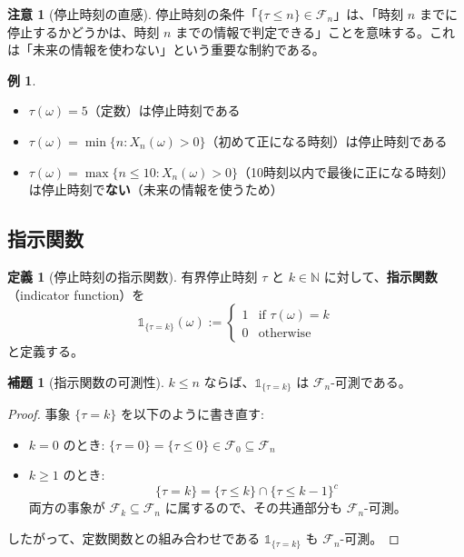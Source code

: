 \documentclass[a4paper,12pt]{ltjsarticle}
\theoremstyle{definition}
\newtheorem{lemma}[theorem]{補題}
\newtheorem{definition}[theorem]{定義}
\newtheorem{example}[theorem]{例}
\newtheorem{remark}[theorem]{注意}
\begin{document}
\begin{remark}[停止時刻の直感]
停止時刻の条件「$\{\tau \leq n\} \in \mathcal{F}_n$」は、「時刻 $n$ までに停止するかどうかは、時刻 $n$ までの情報で判定できる」ことを意味する。これは「未来の情報を使わない」という重要な制約である。
\end{remark}

\begin{example}
\begin{itemize}
\item $\tau(\omega) = 5$（定数）は停止時刻である
\item $\tau(\omega) = \min\{n : X_n(\omega) > 0\}$（初めて正になる時刻）は停止時刻である
\item $\tau(\omega) = \max\{n \leq 10 : X_n(\omega) > 0\}$（10時刻以内で最後に正になる時刻）は停止時刻で\textbf{ない}（未来の情報を使うため）
\end{itemize}
\end{example}

\subsection{指示関数}

\begin{definition}[停止時刻の指示関数]
有界停止時刻 $\tau$ と $k \in \mathbb{N}$ に対して、\textbf{指示関数}（indicator function）を
\[
\mathbb{1}_{\{\tau = k\}}(\omega) :=
\begin{cases}
1 & \text{if } \tau(\omega) = k \\
0 & \text{otherwise}
\end{cases}
\]
と定義する。
\end{definition}

\begin{lemma}[指示関数の可測性]
\label{lem:indicator_measurable}
$k \leq n$ ならば、$\mathbb{1}_{\{\tau = k\}}$ は $\mathcal{F}_n$-可測である。
\end{lemma}

\begin{proof}
事象 $\{\tau = k\}$ を以下のように書き直す:
\begin{itemize}
\item $k = 0$ のとき: $\{\tau = 0\} = \{\tau \leq 0\} \in \mathcal{F}_0 \subseteq \mathcal{F}_n$
\item $k \geq 1$ のとき:
\[
\{\tau = k\} = \{\tau \leq k\} \cap \{\tau \leq k-1\}^c
\]
両方の事象が $\mathcal{F}_k \subseteq \mathcal{F}_n$ に属するので、その共通部分も $\mathcal{F}_n$-可測。
\end{itemize}
したがって、定数関数との組み合わせである $\mathbb{1}_{\{\tau = k\}}$ も $\mathcal{F}_n$-可測。
\end{proof}
\end{document}
